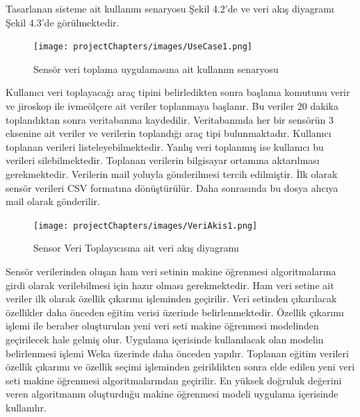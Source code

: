 Tasarlanan sisteme ait kullanım senaryosu Şekil 4.2'de ve veri akış diyagramı Şekil 4.3'de görülmektedir.
\vspace{5mm}
\begin{figure}[!htbp]
\centering
\texttt{[image: projectChapters/images/UseCase1.png]}
\caption{Sensör veri toplama uygulamasına ait kullanım senaryosu}
\end{figure}

Kullanıcı veri toplayacağı araç tipini belirledikten sonra başlama komutunu verir ve jiroskop ile ivmeölçere ait veriler toplanmaya başlanır. Bu veriler 20 dakika toplandıktan sonra veritabanına kaydedilir. Veritabanında her bir sensörün 3 eksenine ait veriler ve verilerin toplandığı araç tipi bulunmaktadır.
Kullanıcı toplanan verileri listeleyebilmektedir. Yanlış veri toplanmış ise kullanıcı bu verileri silebilmektedir. Toplanan verilerin bilgisayar ortamına aktarılması gerekmektedir. Verilerin mail yoluyla gönderilmesi tercih edilmiştir. İlk olarak sensör verileri CSV formatına dönüştürülür. Daha sonrasında bu dosya alıcıya mail olarak gönderilir.

\begin{figure}[!htbp]
\centering
\texttt{[image: projectChapters/images/VeriAkis1.png]}
\caption{Sensor Veri Toplayıcısına ait veri akış diyagramı}
\end{figure}

Sensör verilerinden oluşan ham veri setinin makine öğrenmesi algoritmalarına girdi olarak verilebilmesi için hazır olması gerekmektedir. Ham veri setine ait veriler ilk olarak özellik çıkarımı işleminden geçirilir. Veri setinden çıkarılacak özellikler daha önceden eğitim verisi üzerinde belirlenmektedir. Özellik çıkarımı işlemi ile beraber oluşturulan yeni veri seti makine öğrenmesi modelinden geçirilecek hale gelmiş olur. Uygulama içerisinde kullanılacak olan modelin belirlenmesi işlemi Weka üzerinde daha önceden yapılır. Toplanan eğitim verileri özellik çıkarımı ve özellik seçimi işleminden geirildikten sonra elde edilen yeni veri seti makine öğrenmesi algoritmalarından geçirilir. En yüksek doğruluk değerini veren algoritmanın oluşturduğu makine öğrenmesi modeli uygulama içerisinde kullanılır.

